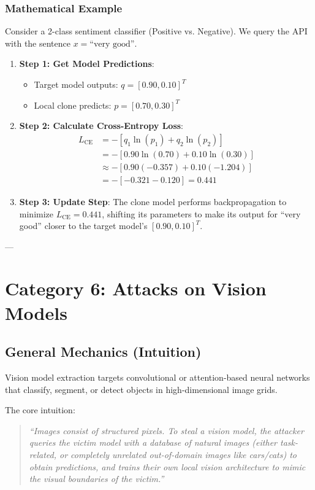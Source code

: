 \documentclass{article}
\begin{document}
\subsubsection{Mathematical Example}
Consider a 2-class sentiment classifier (Positive vs. Negative). We query the API with the sentence $x = \text{``very good''}$.
\begin{enumerate}
    \item \textbf{Step 1: Get Model Predictions}:
    \begin{itemize}
        \item Target model outputs: $q = [0.90, 0.10]^T$
        \item Local clone predicts: $p = [0.70, 0.30]^T$
    \end{itemize}
    
    \item \textbf{Step 2: Calculate Cross-Entropy Loss}:
    \begin{align*}
        L_{\text{CE}} &= - \left[ q_1 \ln(p_1) + q_2 \ln(p_2) \right] \\
        &= - \left[ 0.90 \ln(0.70) + 0.10 \ln(0.30) \right] \\
        &\approx - \left[ 0.90(-0.357) + 0.10(-1.204) \right] \\
        &= - \left[ -0.321 - 0.120 \right] = 0.441
    \end{align*}
    
    \item \textbf{Step 3: Update Step}: The clone model performs backpropagation to minimize $L_{\text{CE}} = 0.441$, shifting its parameters to make its output for ``very good'' closer to the target model's $[0.90, 0.10]^T$.
\end{enumerate}

---

\section{Category 6: Attacks on Vision Models}

\subsection{General Mechanics (Intuition)}
Vision model extraction targets convolutional or attention-based neural networks that classify, segment, or detect objects in high-dimensional image grids.

The core intuition:
\begin{quote}
    \textit{``Images consist of structured pixels. To steal a vision model, the attacker queries the victim model with a database of natural images (either task-related, or completely unrelated out-of-domain images like cars/cats) to obtain predictions, and trains their own local vision architecture to mimic the visual boundaries of the victim.''}
\end{quote}
\end{document}

